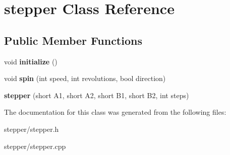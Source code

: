 \hypertarget{classstepper}{}\section{stepper Class Reference}
\label{classstepper}
\subsection*{Public Member Functions}
\begin{DoxyCompactItemize}
\item 
\mbox{\label{classstepper_a294329374cfa14bc65faef71fcf0c780}} 
void {\bfseries initialize} ()
\item 
\mbox{\label{classstepper_aaa1c9583e55db54218231560eeddadb2}} 
void {\bfseries spin} (int speed, int revolutions, bool direction)
\item 
\mbox{\label{classstepper_aceb54bf5d1838efdab59b04132ad3086}} 
{\bfseries stepper} (short A1, short A2, short B1, short B2, int steps)
\end{DoxyCompactItemize}


The documentation for this class was generated from the following files\+:\begin{DoxyCompactItemize}
\item 
stepper/stepper.\+h\item 
stepper/stepper.\+cpp\end{DoxyCompactItemize}
